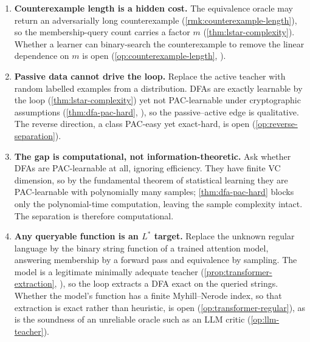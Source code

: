 \begin{enumerate}[leftmargin=*,itemsep=3pt]
\item \textbf{Counterexample length is a hidden cost.} The equivalence oracle may return an adversarially long counterexample (\cref{rmk:counterexample-length}), so the membership-query count carries a factor $m$ (\cref{thm:lstar-complexity}). Whether a learner can binary-search the counterexample to remove the linear dependence on $m$ is open (\cref{op:counterexample-length}, \cite{RivestSchapire1993}).

\item \textbf{Passive data cannot drive the loop.} Replace the active teacher with random labelled examples from a distribution. DFAs are exactly learnable by the loop (\cref{thm:lstar-complexity}) yet not PAC-learnable under cryptographic assumptions (\cref{thm:dfa-pac-hard}, \cite{KearnsValiant1994}), so the passive--active edge is qualitative. The reverse direction, a class PAC-easy yet exact-hard, is open (\cref{op:reverse-separation}).

\item \textbf{The gap is computational, not information-theoretic.} Ask whether DFAs are PAC-learnable at all, ignoring efficiency. They have finite VC dimension, so by the fundamental theorem of statistical learning they are PAC-learnable with polynomially many samples; \cref{thm:dfa-pac-hard} blocks only the polynomial-time computation, leaving the sample complexity intact. The separation is therefore computational.

\item \textbf{Any queryable function is an $L^*$ target.} Replace the unknown regular language by the binary string function of a trained attention model, answering membership by a forward pass and equivalence by sampling. The model is a legitimate minimally adequate teacher (\cref{prop:transformer-extraction}, \cite{WeissGoldbergYahav2018}), so the loop extracts a DFA exact on the queried strings. Whether the model's function has a finite Myhill--Nerode index, so that extraction is exact rather than heuristic, is open (\cref{op:transformer-regular}), as is the soundness of an unreliable oracle such as an LLM critic (\cref{op:llm-teacher}).
\end{enumerate}
